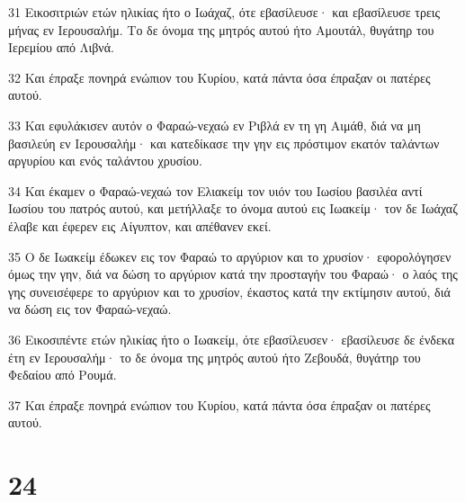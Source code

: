 \par 31 Εικοσιτριών ετών ηλικίας ήτο ο Ιωάχαζ, ότε εβασίλευσε· και εβασίλευσε τρεις μήνας εν Ιερουσαλήμ. Το δε όνομα της μητρός αυτού ήτο Αμουτάλ, θυγάτηρ του Ιερεμίου από Λιβνά.
\par 32 Και έπραξε πονηρά ενώπιον του Κυρίου, κατά πάντα όσα έπραξαν οι πατέρες αυτού.
\par 33 Και εφυλάκισεν αυτόν ο Φαραώ-νεχαώ εν Ριβλά εν τη γη Αιμάθ, διά να μη βασιλεύη εν Ιερουσαλήμ· και κατεδίκασε την γην εις πρόστιμον εκατόν ταλάντων αργυρίου και ενός ταλάντου χρυσίου.
\par 34 Και έκαμεν ο Φαραώ-νεχαώ τον Ελιακείμ τον υιόν του Ιωσίου βασιλέα αντί Ιωσίου του πατρός αυτού, και μετήλλαξε το όνομα αυτού εις Ιωακείμ· τον δε Ιωάχαζ έλαβε και έφερεν εις Αίγυπτον, και απέθανεν εκεί.
\par 35 Ο δε Ιωακείμ έδωκεν εις τον Φαραώ το αργύριον και το χρυσίον· εφορολόγησεν όμως την γην, διά να δώση το αργύριον κατά την προσταγήν του Φαραώ· ο λαός της γης συνεισέφερε το αργύριον και το χρυσίον, έκαστος κατά την εκτίμησιν αυτού, διά να δώση εις τον Φαραώ-νεχαώ.
\par 36 Εικοσιπέντε ετών ηλικίας ήτο ο Ιωακείμ, ότε εβασίλευσεν· εβασίλευσε δε ένδεκα έτη εν Ιερουσαλήμ· το δε όνομα της μητρός αυτού ήτο Ζεβουδά, θυγάτηρ του Φεδαίου από Ρουμά.
\par 37 Και έπραξε πονηρά ενώπιον του Κυρίου, κατά πάντα όσα έπραξαν οι πατέρες αυτού.

\chapter{24}

